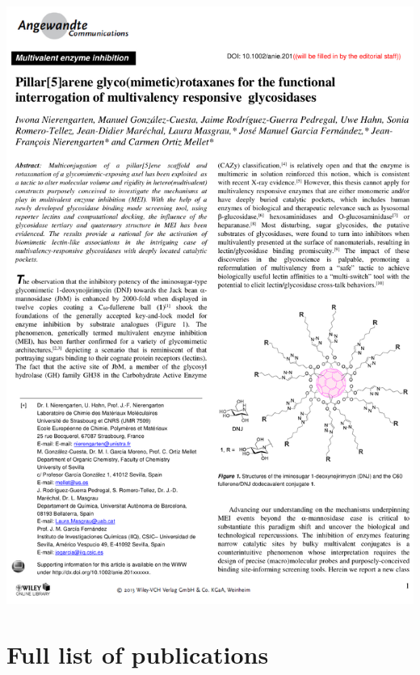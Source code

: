 \includegraphics[width=\textwidth]{figures/pubs/rotaxanes.pdf}

\chapter*{Full list of publications}


